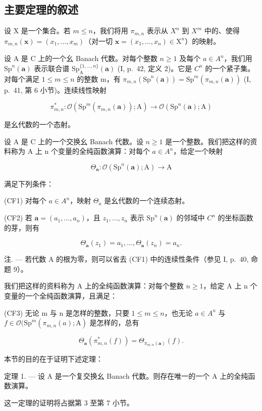 \subsection{主要定理的叙述}

设 X 是一个集合。若 \(m \leqslant n\)，我们将用 \(\pi_{m,n}\) 表示从 \(X^{n}\) 到 \(X^{m}\) 中的、使得 \(\pi_{m,n}(\boldsymbol{x}) = (x_{1}, \ldots, x_{m})\)（对一切 \(\boldsymbol{x} = (x_{1}, \ldots, x_{n}) \in \mathrm{X}^{n}\)）的映射。

设 A 是 C 上的一个幺 Banach 代数。对每个整数 \(n \geqslant 1\) 及每个 \(a \in A^{n}\)，我们用 \(\mathrm{Sp}^{n}(\boldsymbol{a})\) 表示联合谱 \(\mathrm{Sp}_{\mathrm{A}}^{\{1,\ldots,n\}}(\boldsymbol{a})\) (I, p.~42, 定义 2)。它是 \(C^{n}\) 的一个紧子集。对每个满足 \(1 \leqslant m \leqslant n\) 的整数 m，有 \(\pi_{m,n}(\mathrm{Sp}^{n}(\boldsymbol{a})) = \mathrm{Sp}^{m}(\pi_{m,n}(\boldsymbol{a}))\) (I, p.~41, 第 6 小节)。连续线性映射

\[
\pi_ {m, n} ^ {*} \colon \mathcal {O} (\mathrm{Sp} ^ {m} (\pi_ {m, n} (\boldsymbol {a})); \mathrm{A}) \longrightarrow \mathcal {O} (\mathrm{Sp} ^ {n} (\boldsymbol {a}); \mathrm{A})
\]

是幺代数的一个态射。

设 A 是 C 上的一个交换幺 Banach 代数。设 \(n \geqslant 1\) 是一个整数。我们把这样的资料称为 A 上 n 个变量的全纯函数演算：对每个 \(a \in A^{n}\)，给定一个映射

\[
\Theta_ {\boldsymbol {a}} \colon \mathcal {O} (\mathrm{Sp} ^ {n} (\boldsymbol {a}); \mathrm{A}) \longrightarrow \mathrm{A}
\]

满足下列条件：

(CF1) 对每个 \(a \in A^{n}\)，映射 \(\Theta_{a}\) 是幺代数的一个连续态射。

(CF2) 若 \(\boldsymbol{a}=(a_{1},\ldots,a_{n})\)，且 \(z_{1},\ldots,z_{n}\) 表示 \(\mathrm{Sp}^{n}(\boldsymbol{a})\) 的邻域中 \(C^{n}\) 的坐标函数的芽，则有

\[
\Theta_ {\boldsymbol {a}} (z _ {1}) = a _ {1}, \dots , \Theta_ {\boldsymbol {a}} (z _ {n}) = a _ {n}.
\]

注. --- 若代数 A 的根为零，则可以省去 (CF1) 中的连续性条件（参见 I, p.~40, 命题 9）。

我们把这样的资料称为 A 上的全纯函数演算：对每个整数 \(n \geqslant 1\)，给定 A 上 n 个变量的一个全纯函数演算，且满足：

(CF3) 无论 m 与 n 是怎样的整数，只要 \(1 \leqslant m \leqslant n\)，也无论 \(a \in A^{n}\) 与 \(f \in \mathcal{O}(\mathrm{Sp}^{m}(\pi_{m,n}(a); \mathrm{A})\) 是怎样的，总有

\[
\Theta_ {\boldsymbol {a}} (\pi_ {m, n} ^ {*} (f)) = \Theta_ {\pi_ {m, n} (\boldsymbol {a})} (f).
\]

本节的目的在于证明下述定理：

定理 1. --- 设 A 是一个复交换幺 Banach 代数。则存在唯一的一个 A 上的全纯函数演算。

这一定理的证明将占据第 3 至第 7 小节。

